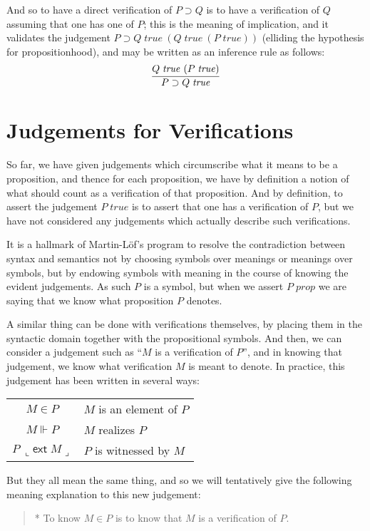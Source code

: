 \documentclass{amsart}
\theoremstyle{definition}
\theoremstyle{remark}
\numberwithin{equation}{section}
\newcommand\isprop[1]{\ensuremath{#1\;\mathit{prop}}}
\newcommand\istrue[1]{\ensuremath{#1\;\mathit{true}}}
\newcommand\hyp[2]{\ensuremath{#1\ (#2)}}
\newcommand\ver[2]{\ensuremath{#1\in#2}}
\begin{document}
And so to have a direct verification of $P\supset Q$ is to have a
verification of $Q$ assuming that one has one of $P$; this is the meaning of
implication, and it validates the judgement \hyp{\istrue{P\supset
Q}}{\hyp{\istrue{Q}}{\istrue{P}}} (elliding the hypothesis for
propositionhood), and may be written as an inference rule as follows:
\[
  \infer{
    \istrue{P\supset Q}
  }{
    \hyp{\istrue{Q}}{\istrue{P}}
  }
\]

\section{Judgements for Verifications}

So far, we have given judgements which circumscribe what it means to be a
proposition, and thence for each proposition, we have by definition a notion of
what should count as a verification of that proposition. And by definition, to
assert the judgement \istrue{P} is to assert that one has a verification of $P$,
but we have not considered any judgements which actually describe such
verifications.

It is a hallmark of Martin-L\"of's program to resolve the contradiction between
syntax and semantics not by choosing symbols over meanings or meanings over
symbols, but by endowing symbols with meaning in the course of knowing the
evident judgements. As such $P$ is a symbol, but when we assert \isprop{P} we
are saying that we know what proposition $P$ denotes.

A similar thing can be done with verifications themselves, by placing them in
the syntactic domain together with the propositional symbols. And then, we can
consider a judgement such as ``$M$ is a verification of $P$'', and in knowing
that judgement, we know what verification $M$ is meant to denote. In practice,
this judgement has been written in several ways:\\\medskip
\begin{tabular}{c|l}
  $M\in P$ & $M$ is an element of $P$\\
  $M\Vdash P$ & $M$ realizes $P$\\
  $P\ \llcorner\mathsf{ext}\; M\lrcorner$ & $P$ is witnessed by $M$
\end{tabular}

But they all mean the same thing, and so we will tentatively give the following
meaning explanation to this new judgement:
\begin{quote}
  * To know $\ver{M}{P}$ is to know that $M$ is a verification of $P$.
\end{quote}
\end{document}
